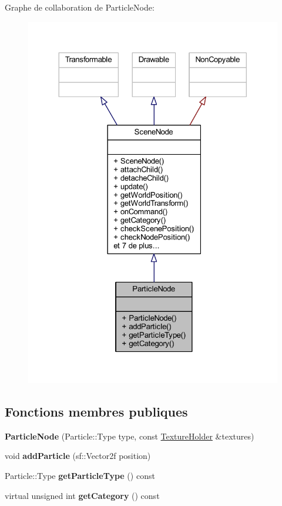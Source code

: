 Graphe de collaboration de Particle\+Node\+:\nopagebreak
\begin{figure}[H]
\begin{center}
\leavevmode
\includegraphics[width=324pt]{class_particle_node__coll__graph}
\end{center}
\end{figure}
\subsection*{Fonctions membres publiques}
\begin{DoxyCompactItemize}
\item 
\hypertarget{class_particle_node_a97ec6b5e658179a7a78a909ee8661a1a}{}\label{class_particle_node_a97ec6b5e658179a7a78a909ee8661a1a} 
{\bfseries Particle\+Node} (Particle\+::\+Type type, const \hyperlink{class_resource_holder}{Texture\+Holder} \&textures)
\item 
\hypertarget{class_particle_node_aba35c74ce9a85194489726b82ab53f80}{}\label{class_particle_node_aba35c74ce9a85194489726b82ab53f80} 
void {\bfseries add\+Particle} (sf\+::\+Vector2f position)
\item 
\hypertarget{class_particle_node_aa0e084971d3c1649077cfeacc75faabd}{}\label{class_particle_node_aa0e084971d3c1649077cfeacc75faabd} 
Particle\+::\+Type {\bfseries get\+Particle\+Type} () const
\item 
\hypertarget{class_particle_node_aa74bf56dc711a32a4722fad6002c4f98}{}\label{class_particle_node_aa74bf56dc711a32a4722fad6002c4f98} 
virtual unsigned int {\bfseries get\+Category} () const
\end{DoxyCompactItemize}
